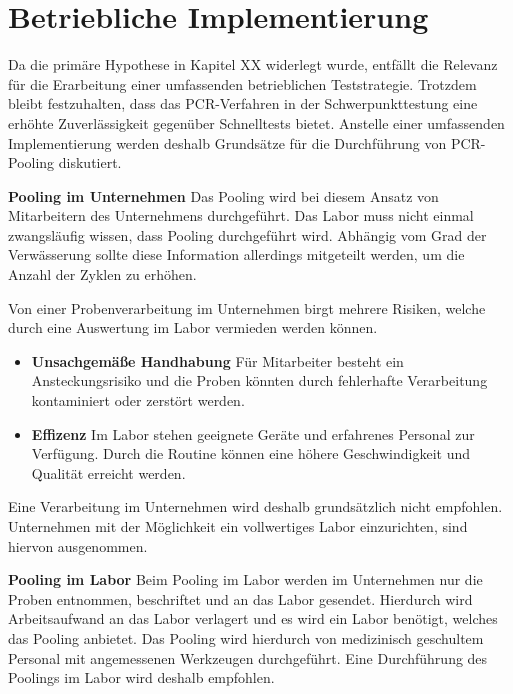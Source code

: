 \chapter{Betriebliche Implementierung}
Da die primäre Hypothese in Kapitel XX widerlegt wurde, entfällt die Relevanz für die Erarbeitung einer umfassenden betrieblichen Teststrategie.
Trotzdem bleibt festzuhalten, dass das PCR-Verfahren in der Schwerpunkttestung eine erhöhte Zuverlässigkeit gegenüber Schnelltests bietet.
Anstelle einer umfassenden Implementierung werden deshalb Grundsätze für die Durchführung von PCR-Pooling diskutiert.

\textbf{Pooling im Unternehmen}\newline
Das Pooling wird bei diesem Ansatz von Mitarbeitern des Unternehmens durchgeführt.
Das Labor muss nicht einmal zwangsläufig wissen, dass Pooling durchgeführt wird.
Abhängig vom Grad der Verwässerung sollte diese Information allerdings mitgeteilt werden, um die Anzahl der Zyklen zu erhöhen.

Von einer Probenverarbeitung im Unternehmen birgt mehrere Risiken, welche durch eine Auswertung im Labor vermieden werden können.

\begin{itemize}
	\item \textbf{Unsachgemäße Handhabung}\newline
	Für Mitarbeiter besteht ein Ansteckungsrisiko und die Proben könnten durch fehlerhafte Verarbeitung kontaminiert oder zerstört werden.
	\item \textbf{Effizenz}\newline
	Im Labor stehen geeignete Geräte und erfahrenes Personal zur Verfügung.
	Durch die Routine können eine höhere Geschwindigkeit und Qualität erreicht werden.
\end{itemize}

Eine Verarbeitung im Unternehmen wird deshalb grundsätzlich nicht empfohlen.
Unternehmen mit der Möglichkeit ein vollwertiges Labor einzurichten, sind hiervon ausgenommen.

\textbf{Pooling im Labor}\newline
Beim Pooling im Labor werden im Unternehmen nur die Proben entnommen, beschriftet und an das Labor gesendet.
Hierdurch wird Arbeitsaufwand an das Labor verlagert und es wird ein Labor benötigt, welches das Pooling anbietet.
Das Pooling wird hierdurch von medizinisch geschultem Personal mit angemessenen Werkzeugen durchgeführt.
Eine Durchführung des Poolings im Labor wird deshalb empfohlen.

